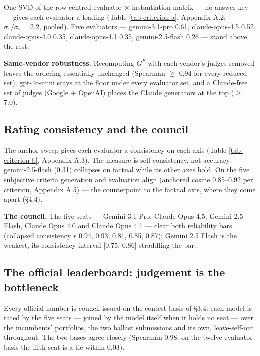 \documentclass{article}
\begin{document}
One SVD of the row-centred evaluator \ensuremath{\times} instantiation matrix --- no answer key --- gives each evaluator a loading (Table \ref{tab-criterion-a}, Appendix A.2; \(\sigma_1/\sigma_2 = 2.2\), pooled). Five evaluators --- gemini-3.1-pro 0.61, claude-opus-4.5 0.52, claude-opus-4.0 0.35, claude-opus-4.1 0.35, gemini-2.5-flash 0.26 --- stand above the rest.

\textbf{Same-vendor robustness.} Recomputing \(G^{F}\) with each vendor's judges removed leaves the ordering essentially unchanged (Spearman \ensuremath{\ge} 0.94 for every reduced set); gpt-4o-mini stays at the floor under every evaluator set, and a Claude-free set of judges (Google + OpenAI) places the Claude generators at the top (\ensuremath{\ge} 7.0).

\subsection{Rating consistency and the council}\label{rating-consistency-and-the-council}

The anchor sweep gives each evaluator a consistency on each axis (Table \ref{tab-criterion-b}, Appendix A.3). The measure is self-consistency, not accuracy: gemini-2.5-flash (0.31) collapses on factual while its other axes hold. On the five subjective criteria generation and evaluation align (anchored cosine 0.85--0.92 per criterion, Appendix A.5) --- the counterpoint to the factual axis, where they come apart (\S{}4.4).

\textbf{The council.} The five seats --- Gemini 3.1 Pro, Claude Opus 4.5, Gemini 2.5 Flash, Claude Opus 4.0 and Claude Opus 4.1 --- clear both reliability bars (collapsed consistency \(\bar r\) 0.94, 0.93, 0.81, 0.85, 0.87); Gemini 2.5 Flash is the weakest, its consistency interval {[}0.75, 0.86{]} straddling the bar.

\subsection{The official leaderboard: judgement is the bottleneck}\label{the-official-leaderboard-judgement-is-the-bottleneck}

Every official number is council-issued on the contest basis of \S{}3.4: each model is rated by the five seats --- joined by the model itself when it holds no seat --- over the incumbents' portfolios, the two ballast submissions and its own, leave-self-out throughout. The two bases agree closely (Spearman 0.98; on the twelve-evaluator basis the fifth seat is a tie within 0.03).
\end{document}
